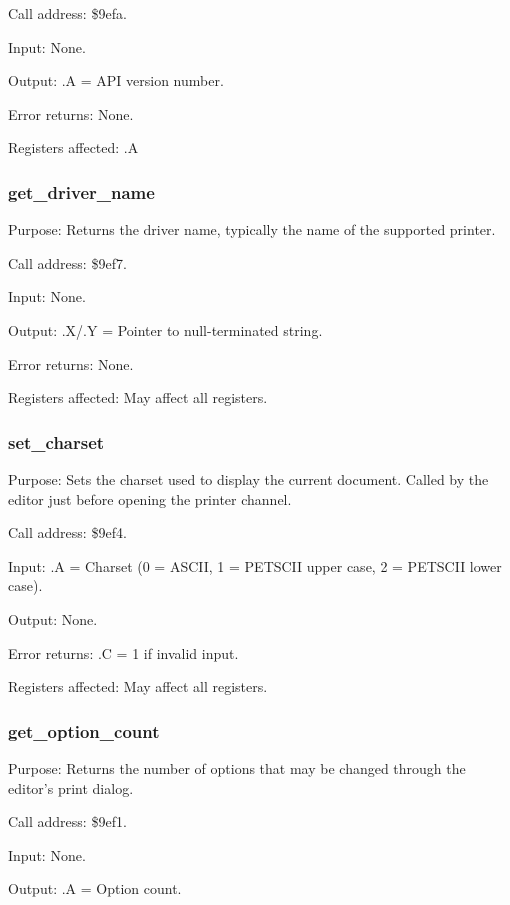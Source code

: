 \documentclass{article}
\begin{document}
            Call address: \$9efa.

            Input: None.
            
            Output: .A = API version number.

            Error returns: None.

            Registers affected: .A
        
        \subsubsection{get\_driver\_name}
            Purpose: Returns the driver name, typically the
            name of the supported printer.

            Call address: \$9ef7.

            Input: None.

            Output: .X/.Y = Pointer to null-terminated string.

            Error returns: None.

            Registers affected: May affect all registers.

        \subsubsection{set\_charset}
            Purpose: Sets the charset used to display the current
            document. Called by the editor just before opening
            the printer channel.

            Call address: \$9ef4.

            Input: .A = Charset (0 = ASCII, 1 = PETSCII upper case, 2 = PETSCII lower case).

            Output: None.

            Error returns: .C = 1 if invalid input.

            Registers affected: May affect all registers.

        \subsubsection{get\_option\_count}
            Purpose: Returns the number of options that may be changed through the
            editor's print dialog.

            Call address: \$9ef1.

            Input: None.

            Output: .A = Option count.
\end{document}

